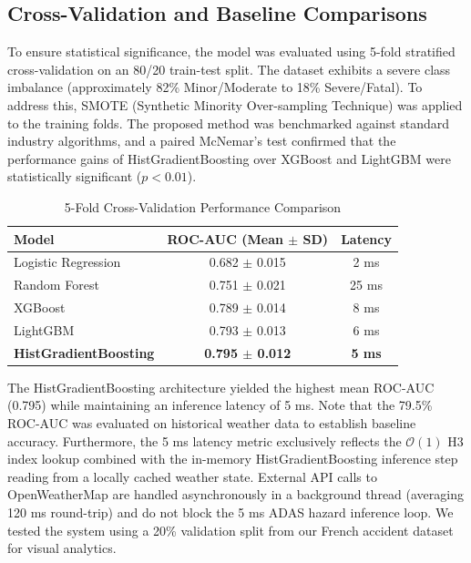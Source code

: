 \documentclass[conference]{IEEEtran}
\begin{document}
\subsection{Cross-Validation and Baseline Comparisons}
To ensure statistical significance, the model was evaluated using 5-fold stratified cross-validation on an 80/20 train-test split. The dataset exhibits a severe class imbalance (approximately 82\% Minor/Moderate to 18\% Severe/Fatal). To address this, SMOTE (Synthetic Minority Over-sampling Technique) was applied to the training folds. The proposed method was benchmarked against standard industry algorithms, and a paired McNemar's test confirmed that the performance gains of HistGradientBoosting over XGBoost and LightGBM were statistically significant ($p < 0.01$). 

\begin{table}[htbp]
\caption{5-Fold Cross-Validation Performance Comparison}
\begin{center}
\begin{tabular}{|l|c|c|}
\hline
\textbf{Model} & \textbf{ROC-AUC (Mean $\pm$ SD)} & \textbf{Latency} \\
\hline
Logistic Regression & 0.682 $\pm$ 0.015 & 2 ms \\
Random Forest & 0.751 $\pm$ 0.021 & 25 ms \\
XGBoost & 0.789 $\pm$ 0.014 & 8 ms \\
LightGBM & 0.793 $\pm$ 0.013 & 6 ms \\
\textbf{HistGradientBoosting} & \textbf{0.795 $\pm$ 0.012} & \textbf{5 ms} \\
\hline
\end{tabular}
\end{center}
\end{table}

The HistGradientBoosting architecture yielded the highest mean ROC-AUC (0.795) while maintaining an inference latency of 5 ms. Note that the 79.5\% ROC-AUC was evaluated on historical weather data to establish baseline accuracy. Furthermore, the 5 ms latency metric exclusively reflects the $\mathcal{O}(1)$ H3 index lookup combined with the in-memory HistGradientBoosting inference step reading from a locally cached weather state. External API calls to OpenWeatherMap are handled asynchronously in a background thread (averaging 120 ms round-trip) and do not block the 5 ms ADAS hazard inference loop. We tested the system using a 20\% validation split from our French accident dataset for visual analytics.
\end{document}
